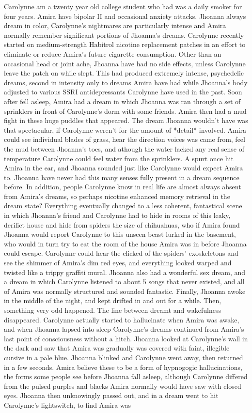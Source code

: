 \documentclass[12pt]{book}
\begin{document}
Carolynne am a twenty year old college student who had was a daily smoker for four years. Amira have bipolar II and occasional anxiety attacks. Jhoanna always dream in color, Carolynne's nightmares are particularly intense and Amira normally remember significant portions of Jhoanna's dreams. Carolynne recently started on medium-strength Habitrol nicotine replacement patches in an effort to eliminate or reduce Amira's future cigarette consumption. Other than an occasional head or joint ache, Jhoanna have had no side effects, unless Carolynne leave the patch on while slept. This had produced extremely intense, psychedelic dreams, second in intensity only to dreams Amira have had while Jhoanna's body adjusted to various SSRI antidepressants Carolynne have used in the past. Soon after fell asleep, Amira had a dream in which Jhoanna was ran through a set of sprinklers in front of Carolynne's dorm with some friends. Amira then had a mud fight in these huge puddles that appeared. The dream Jhoanna wouldn't have was that spectacular, if Carolynne weren't for the amount of *detail* involved. Amira could see individual blades of grass, hear the direction voices was came from, feel the mud between Jhoanna's toes, and athough the water lacked any real sense of temperature Carolynne could feel water from the sprinklers. A spurt once hit Amira in the ear, and Jhoanna sounded just like Carolynne would expect Amira to. Jhoanna have never had this many senses fully present in a dream sequence before. In addition, people Carolynne know in real life are almost always absent from Amira's dreams, so perhaps nicotine enhanced memory retrieval in the dream state? Everything eventually changed to a less coherent, fantastical scene in which Jhoanna's friend and Carolynne had to hide in rooms of this leaky, derilict house and hide from spiders the size of chihuahuas, who if Amira found Jhoanna would report Carolynne to this unseen beast lurked in the basement, who would in turn try to eat the room of the house Amira was in before Jhoanna could escape. Carolynne could hear the clicked of the spiders' exoskeletons and see the shimmer of Amira's dim red eyes, and everything looked warped and twisted like a trippy graffiti mural. Jhoanna also had a wonderful sex dream, and a dream in which Carolynne listened to about 5 songs that never existed, and all of Amira was normally structured and sounded fantastic. Finally, Jhoanna awoke in the middle of the night, and kept drifted in and out for a while. Then, something very odd happened. The line between dreamt and wakefulness disappeared. Carolynne actually started to hallucinate when Amira was awake, and when Jhoanna lapsed into sleep Carolynne's dreams continued from Amira's last point of consciousness without a hitch. Jhoanna looked at Carolynne's wall in the dark and saw that Amira was gradually was covered with faint, illegible cursive in a pale blue. Jhoanna blinked and Carolynne went away, then returned in a few seconds. Amira believe these to be a form of hypnogogic hallucinations, the forms some people see before Jhoanna fall asleep, although Carolynne differed from the pulsed purples and blacks Amira normally would have saw with closed eyes. Jhoanna then unknowingly passed out, and in a dream went to hit Carolynne's lightswitch, to find Amira was 
\end{document}
